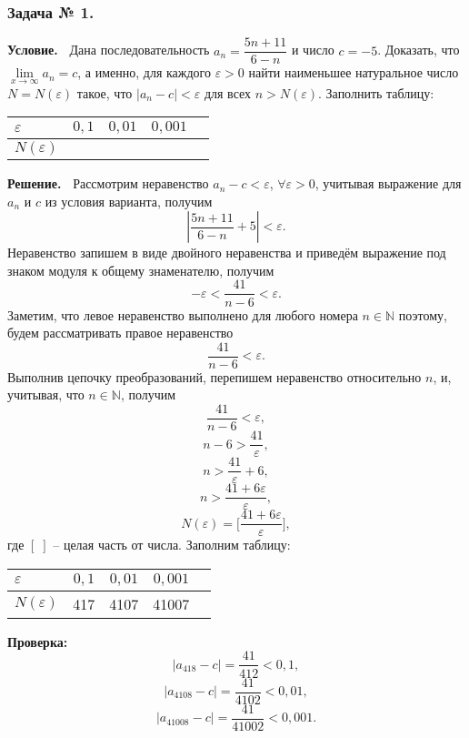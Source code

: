 \documentclass[12pt]{article}
\begin{document}
\subsubsection*{\center Задача № 1.}
{\bf Условие.~}
Дана последовательность $a_{n}=\dfrac{5n+11}{6-n}$ и число $c=-5$. Доказать, что $\lim\limits_{x\rightarrow\infty} a_{n}=c $, а именно, для каждого $\varepsilon>0$ найти наименьшее натуральное число  $N{=}N(\varepsilon)$ такое, что $|a_{n}-c|<\varepsilon$ для всех $n>N(\varepsilon)$. Заполнить таблицу: 
\begin{center}
\begin{tabular}{ | p{25pt} | c | c | c | c |}
\hline
$\varepsilon$& $0{,}1$ & $0{,}01$ & $0{,}001$ \\ \hline
$N(\varepsilon)$ &   &   &\\
\hline
\end{tabular}
\end{center}
\medskip
{\bf Решение.~}
Рассмотрим неравенство $a_{n}-c<\varepsilon$, $\forall\varepsilon>0$, учитывая выражение для $a_{n}$ и $c$ из условия варианта, получим 
$$\left|\frac{5n+11}{6-n}+5\right|<\varepsilon.$$
Неравенство запишем в виде двойного неравенства и приведём выражение под знаком модуля к общему знаменателю, получим
$${-}\varepsilon <\dfrac{41}{n-6}<\varepsilon.$$
Заметим, что левое неравенство выполнено для любого номера $n\in \mathbb{N}$ поэтому, будем рассматривать правое неравенство
$$\frac{41}{n-6}<\varepsilon.$$
Выполнив цепочку преобразований, перепишем неравенство относительно $n$, и, учитывая, что $n\in \mathbb{N}$, получим 
$$\dfrac{41}{n-6}<\varepsilon,$$
$$n-6>\dfrac{41}{\varepsilon},$$
$$n>\dfrac{41}{\varepsilon}+6,$$
$$n>\dfrac{41+6\varepsilon}{\varepsilon},$$
$$N(\varepsilon)=\biggl[\dfrac{41+6\varepsilon}{\varepsilon}\biggr],$$
где $[\;]$ -- целая часть от числа. Заполним таблицу:
\begin{center}
\begin{tabular}{ | p{25pt} | c | c | c | c |}
\hline
$\varepsilon$& $0{,}1$ & $0{,}01$ & $0{,}001$ \\ \hline
$N(\varepsilon)$ & 417  & 4107 & 41007\\
\hline
\end{tabular}
\end{center}
{\bf Проверка:~}
$$|a_{418}-c|=\dfrac{41}{412}<0{,}1,$$
$$|a_{4108}-c|=\dfrac{41}{4102}<0{,}01,$$
$$|a_{41008}-c|=\dfrac{41}{41002}<0{,}001.$$
\newpage
\end{document}
